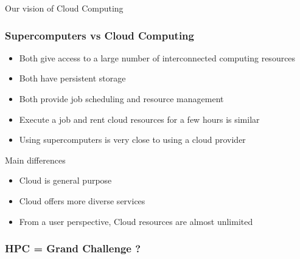 \documentclass[10pt,aspectratio=1609]{beamer}
\begin{document}
\begin{section}{Our vision of Cloud Computing}



\begin{frame}
  \frametitle{Supercomputers vs Cloud Computing}

    \begin{itemize}
      \item Both give access to a large number of interconnected computing resources
      \item Both have persistent storage
      \item Both provide job scheduling and resource management
      \item Execute a job and rent cloud resources for a few hours is similar
      \item Using supercomputers is very close to using a cloud provider
    \end{itemize}

    \begin{block}{Main differences}
      \begin{itemize}
        \item Cloud is general purpose
        \item Cloud offers more diverse services
        \item From a user perspective, Cloud resources are almost unlimited
      \end{itemize}
    \end{block}
\end{frame}


\begin{frame}
  \frametitle{HPC = Grand Challenge ?}



\end{frame}
\end{section}
\end{document}
